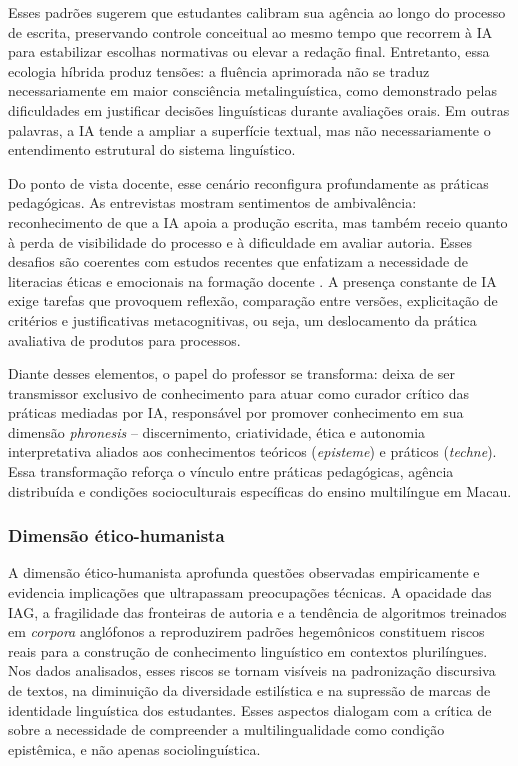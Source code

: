 \documentclass[portuguese]{textolivre}
\begin{document}
Esses padrões sugerem que estudantes calibram sua agência ao longo do processo de escrita, preservando controle conceitual ao mesmo tempo que recorrem à IA para estabilizar escolhas normativas ou elevar a redação final. Entretanto, essa ecologia híbrida produz tensões: a fluência aprimorada não se traduz necessariamente em maior consciência metalinguística, como demonstrado pelas dificuldades em justificar decisões linguísticas durante avaliações orais. Em outras palavras, a IA tende a ampliar a superfície textual, mas não necessariamente o entendimento estrutural do sistema linguístico.

Do ponto de vista docente, esse cenário reconfigura profundamente as práticas pedagógicas. As entrevistas mostram sentimentos de ambivalência: reconhecimento de que a IA apoia a produção escrita, mas também receio quanto à perda de visibilidade do processo e à dificuldade em avaliar autoria. Esses desafios são coerentes com estudos recentes que enfatizam a necessidade de literacias éticas e emocionais na formação docente \cite{SperlingEtAl2024, XieEtAl2025}. A presença constante de IA exige tarefas que provoquem reflexão, comparação entre versões, explicitação de critérios e justificativas metacognitivas, ou seja, um deslocamento da prática avaliativa de produtos para processos.

Diante desses elementos, o papel do professor se transforma: deixa de ser transmissor exclusivo de conhecimento para atuar como curador crítico das práticas mediadas por IA, responsável por promover conhecimento em sua dimensão \textit{phronesis} – discernimento, criatividade, ética e autonomia interpretativa aliados aos conhecimentos teóricos (\textit{episteme}) e práticos (\textit{techne}). Essa transformação reforça o vínculo entre práticas pedagógicas, agência distribuída e condições socioculturais específicas do ensino multilíngue em Macau.


\subsubsection{Dimensão ético-humanista}\label{sec-ana-et}

A dimensão ético-humanista aprofunda questões observadas empiricamente e evidencia implicações que ultrapassam preocupações técnicas. A opacidade das IAG, a fragilidade das fronteiras de autoria e a tendência de algoritmos treinados em \textit{corpora} anglófonos a reproduzirem padrões hegemônicos constituem riscos reais para a construção de conhecimento linguístico em contextos plurilíngues. Nos dados analisados, esses riscos se tornam visíveis na padronização discursiva de textos, na diminuição da diversidade estilística e na supressão de marcas de identidade linguística dos estudantes. Esses aspectos dialogam com a crítica de \textcite{Agnihotri2025} sobre a necessidade de compreender a multilingualidade como condição epistêmica, e não apenas sociolinguística.
\end{document}
